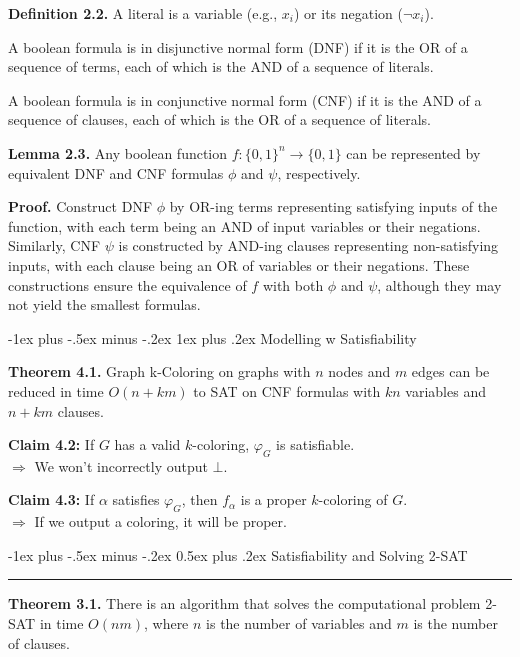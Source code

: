 \documentclass[10pt,landscape]{article}
\makeatletter
\renewcommand{\section}{\@startsection{section}{1}{0mm}%
                                {-1ex plus -.5ex minus -.2ex}%
                                {0.5ex plus .2ex}%
                                {\normalfont\large\bfseries}}
\renewcommand{\subsubsection}{\@startsection{subsubsection}{3}{0mm}%
                                {-1ex plus -.5ex minus -.2ex}%
                                {1ex plus .2ex}%
                                {\normalfont\small\bfseries}}
\makeatother
\begin{document}
\begin{multicols*}{3}
\smallskip

\textbf{Definition 2.2.} A literal is a variable (e.g., $x_i$) or its negation ($\neg x_i$).

A boolean formula is in disjunctive normal form (DNF) if it is the OR of a sequence of terms, each of which is the AND of a sequence of literals.

A boolean formula is in conjunctive normal form (CNF) if it is the AND of a sequence of clauses, each of which is the OR of a sequence of literals.

\smallskip

\textbf{Lemma 2.3.} Any boolean function $f : \{0, 1\}^n \to \{0, 1\}$ can be represented by equivalent DNF and CNF formulas $\phi$ and $\psi$, respectively.

\textbf{Proof.} Construct DNF $\phi$ by OR-ing terms representing satisfying inputs of the function, with each term being an AND of input variables or their negations. Similarly, CNF $\psi$ is constructed by AND-ing clauses representing non-satisfying inputs, with each clause being an OR of variables or their negations. These constructions ensure the equivalence of $f$ with both $\phi$ and $\psi$, although they may not yield the smallest formulas.

\subsubsection{Modelling w Satisfiability}

\textbf{Theorem 4.1.} Graph k-Coloring on graphs with $n$ nodes and $m$ edges can be reduced in time $O(n + km)$ to SAT on CNF formulas with $kn$ variables and $n + km$ clauses.

\textbf{Claim 4.2:} If $G$ has a valid $k$-coloring, $\varphi_G$ is satisfiable. \\
$\Rightarrow$ We won't incorrectly output $\bot$.

\textbf{Claim 4.3:} If $\alpha$ satisfies $\varphi_G$, then $f_\alpha$ is a proper $k$-coloring of $G$. \\
$\Rightarrow$ If we output a coloring, it will be proper.

\section{Satisfiability and Solving 2-SAT}\smallskip \hrule height 2pt \smallskip

\textbf{Theorem 3.1.} There is an algorithm that solves the computational problem 2-SAT in time $O(nm)$, where $n$ is the number of variables and $m$ is the number of clauses.


\end{multicols*}
\end{document}

